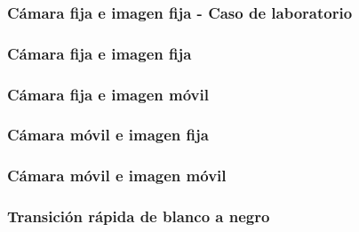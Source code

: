 \subsubsection{Cámara fija e imagen fija - Caso de laboratorio}

\subsubsection{Cámara fija e imagen fija}

\subsubsection{Cámara fija e imagen móvil}

\subsubsection{Cámara móvil e imagen fija}

\subsubsection{Cámara móvil e imagen móvil}

\subsubsection{Transición rápida de blanco a negro}

